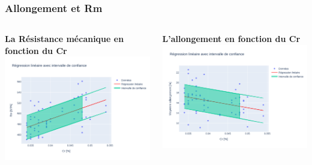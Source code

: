 \documentclass[aspectratio=169]{beamer}
\begin{document}
\begin{frame}
\frametitle{Allongement et Rm}
\begin{columns}[t]
  \begin{column}{0.5\textwidth}
    \centering
    \textbf{La Résistance mécanique en fonction du Cr} \\
    \includegraphics[width=\textwidth]{Figures/Regression_Cr_Rm.pdf} 
  \end{column}
  \begin{column}{0.5\textwidth}
    \centering
    \textbf{L'allongement en fonction du  Cr} \\
    \includegraphics[width=\textwidth]{Figures/Regression_Cr_Allongement.pdf} 
  \end{column}
\end{columns}
\end{frame}
\end{document}

